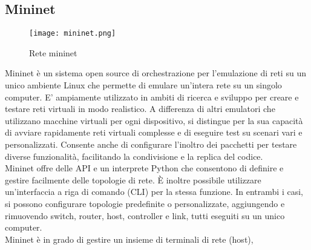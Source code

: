 \subsection{Mininet}
\label{ch:Mininet}
\begin{figure}[h]
    \centering
   \texttt{[image: mininet.png]}
    \caption{Rete mininet}
    \label{fig:mininet}
\end{figure}
Mininet \cite{mininet} è un sistema open source di orchestrazione per l'emulazione di reti su un unico ambiente Linux che permette di emulare un'intera rete su un singolo computer.
E' ampiamente utilizzato in ambiti di ricerca e sviluppo per creare e testare reti virtuali in modo realistico.
A differenza di altri emulatori che utilizzano macchine virtuali per ogni dispositivo, si distingue per la sua capacità di avviare rapidamente reti virtuali complesse e di eseguire test su scenari vari e personalizzati.
Consente anche di configurare l'inoltro dei pacchetti per testare diverse funzionalità, facilitando la condivisione e la replica del codice.
\\Mininet offre delle API e un interprete Python che consentono di definire e gestire facilmente delle topologie di rete.
È inoltre possibile utilizzare un'interfaccia a riga di comando (CLI) per la stessa funzione.
In entrambi i casi, si possono configurare topologie predefinite o personalizzate, aggiungendo e rimuovendo switch, router, host, controller e link, tutti eseguiti su un unico computer.
\\Mininet è in grado di gestire un insieme di terminali di rete (host), 
